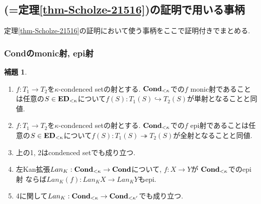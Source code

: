 \documentclass[dvipdfmx,a4paper,11pt]{article}
\theoremstyle{definition}
\newtheorem{lem}[thm]{補題}
\begin{document}
\subsection{\cite[Proposition 2.15, Theorem 2.16]{Sch19}(=定理\ref{thm-Scholze-21516})の証明で用いる事柄}
定理\ref{thm-Scholze-21516}の証明において使う事柄をここで証明付きでまとめる. 

 \subsubsection{{\bf Cond}のmonic射, epi射}

 
 \begin{tcolorbox}
 [colback = white, colframe = green!35!black, fonttitle = \bfseries,breakable = true]
 \begin{lem}\cite[Theorem 4.11.2, 4.11.3, 4.11.4]{Bar22}
 \label{lem-cond-epi}
 \text{}
 \begin{enumerate}
 \item $f : T_1 \to T_2$を$\kappa$-condenced setの射とする. ${\bf Cond}_{<\kappa}$での$f$ monic射であることは任意の$S \in {\bf ED}_{<\kappa}$について$f(S) : T_1(S) \hookrightarrow T_2(S)$が単射となることと同値.
  \item $f : T_1 \to T_2$を$\kappa$-condenced setの射とする.
   ${\bf Cond}_{<\kappa}$での$f$ epi射であることは任意の$S \in {\bf ED}_{<\kappa}$について$f(S) : T_1(S) \twoheadrightarrow T_2(S)$が全射となることと同値.
  \item 上の1, 2はcondenced setでも成り立つ. 
  \item 左Kan拡張$Lan_{K} : {\bf Cond}_{<\kappa} \to {\bf Cond}$について, $f : X \to Y$が
${\bf Cond}_{<\kappa}$でのepi射
  ならば$Lan_{K}(f) : Lan_{K}X \to Lan_{K}Y$もepi.
  \item 4に関して$Lan_{K} : {\bf Cond}_{<\kappa} \to {\bf Cond}_{< \kappa'}$でも成り立つ. 
 \end{enumerate}
 \end{lem}
 \end{tcolorbox}
\end{document}
